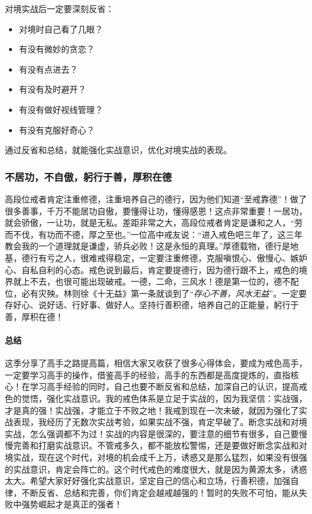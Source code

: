 对境实战后一定要深刻反省：

\begin{multicols}{2}
    \begin{itemize}
        \item 对境时自己看了几眼？
        \item 有没有微妙的贪恋？
        \item 有没有点进去？
        \item 有没有及时避开？
        \item 有没有做好视线管理？
        \item 有没有克服好奇心？
    \end{itemize}
\end{multicols}

通过反省和总结，就能强化实战意识，优化对境实战的表现。

\subsubsection{不居功，不自傲，躬行于善，厚积在德}

高段位戒者肯定注重修德，注重培养自己的德行，因为他们知道“至戒靠德”！做了很多善事，千万不能居功自傲，要懂得让功，懂得感恩！这点非常重要！一居功，就会骄傲，一让功，就是无私。差距非常之大，高段位戒者肯定是谦和之人，“劳而不伐，有功而不德，厚之至也。”一位高中戒友说：“进入戒色吧三年了，这三年教会我的一个道理就是谦虚，骄兵必败！这是永恒的真理。”厚德载物，德行是地基，德行有亏之人，很难戒得稳定，一定要注重修德，克服嗔恨心、傲慢心、嫉妒心、自私自利的心态。戒色说到最后，肯定要提德行，因为德行跟不上，戒色的境界就上不去，也很可能出现破戒。一德，二命，三风水！德是第一位的，德不配位，必有灾殃。林则徐《十无益》第一条就谈到了“\textit{存心不善，风水无益}”。一定要存好心、说好话、行好事、做好人。坚持行善积德，培养自己的正能量，躬行于善，厚积在德！


\paragraph{总结}

这季分享了高手之路提高篇，相信大家又收获了很多心得体会，要成为戒色高手，一定要学习高手的操作，借鉴高手的经验，高手的东西都是高度提炼的，直指核心！在学习高手经验的同时，自己也要不断反省和总结，加深自己的认识，提高戒色的觉悟，强化实战意识。我的戒色体系是立足于实战的，因为我坚信：实战强，才是真的强！实战强，才能立于不败之地！我戒到现在一次未破，就因为强化了实战表现，我经历了无数次实战考验，如果实战不强，肯定早破了。断念实战和对境实战，怎么强调都不为过！实战的内容是很深的，要注意的细节有很多，自己要慢慢完善和打磨实战意识。不管戒多久，都不能放松警惕，还是要做好断念实战和对境实战，现在这个时代，对境的机会成千上万，诱惑又是那么猛烈，如果没有很强的实战意识，肯定会阵亡的。这个时代戒色的难度很大，就是因为黄源太多，诱惑太大。希望大家好好强化实战意识，坚定自己的信心和立场，行善积德，加强自律，不断反省、总结和完善，你们肯定会越戒越强的！暂时的失败不可怕，能从失败中强势崛起才是真正的强者！

